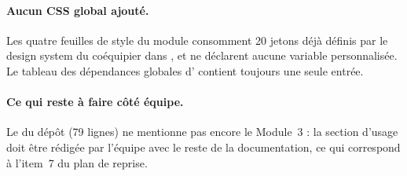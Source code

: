 \paragraph{Aucun CSS global ajouté.} Les quatre feuilles de style du module
consomment 20 jetons  déjà définis par le design system du
coéquipier dans , et ne déclarent aucune variable
personnalisée. Le tableau des dépendances globales d'
contient toujours une seule entrée.

\paragraph{Ce qui reste à faire côté équipe.} Le  du dépôt
(79 lignes) ne mentionne pas encore le Module~3 : la section d'usage doit être
rédigée par l'équipe avec le reste de la documentation, ce qui correspond à
l'item~7 du plan de reprise.
